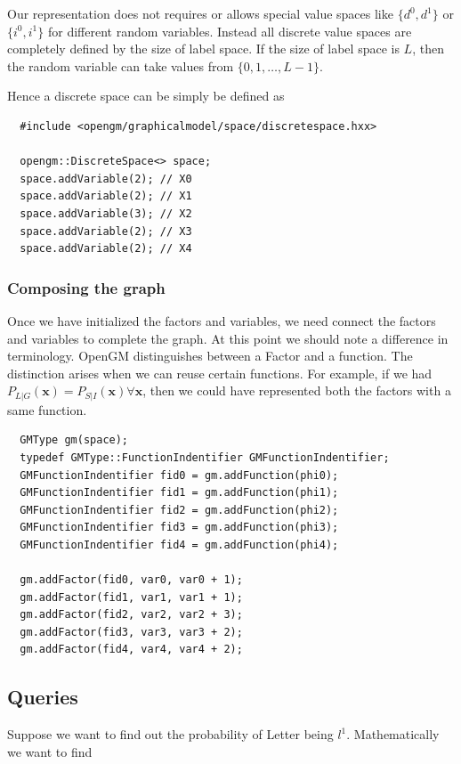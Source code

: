 \documentclass[12pt,oneside,letterpaper]{article}
\begin{document}
Our representation does not requires or allows special value spaces like
$\{d^0, d^1\}$ or $\{i^0, i^1\}$ for different random variables. 
Instead all discrete value spaces are completely defined by the size of label
space. If the size of label space is $L$, then the random variable can take
values from $\{0, 1, \dots, L - 1\}$.

Hence a discrete space can be simply be defined as 

\begin{lstlisting}
  #include <opengm/graphicalmodel/space/discretespace.hxx>

  opengm::DiscreteSpace<> space;
  space.addVariable(2); // X0
  space.addVariable(2); // X1
  space.addVariable(3); // X2
  space.addVariable(2); // X3
  space.addVariable(2); // X4
\end{lstlisting}

\subsubsection{Composing the graph}

Once we have initialized the factors and variables, we need connect the factors
and variables to complete the graph. At this point we should note a
difference in terminology. OpenGM distinguishes between a Factor and a
function.  The distinction arises when we can reuse certain functions. For
example, if we had $P_{L|G}(\mathbf{x}) = P_{S|I}(\mathbf{x}) \forall
\mathbf{x}$, then we could have represented both the factors with a same
function.

\begin{lstlisting}
  GMType gm(space);
  typedef GMType::FunctionIndentifier GMFunctionIndentifier;
  GMFunctionIndentifier fid0 = gm.addFunction(phi0);
  GMFunctionIndentifier fid1 = gm.addFunction(phi1);
  GMFunctionIndentifier fid2 = gm.addFunction(phi2);
  GMFunctionIndentifier fid3 = gm.addFunction(phi3);
  GMFunctionIndentifier fid4 = gm.addFunction(phi4);

  gm.addFactor(fid0, var0, var0 + 1);
  gm.addFactor(fid1, var1, var1 + 1);
  gm.addFactor(fid2, var2, var2 + 3);
  gm.addFactor(fid3, var3, var3 + 2);
  gm.addFactor(fid4, var4, var4 + 2);
\end{lstlisting}


\subsection{Queries}
Suppose we want to find out the probability of Letter being $l^1$.
Mathematically we want to find
\end{document}
